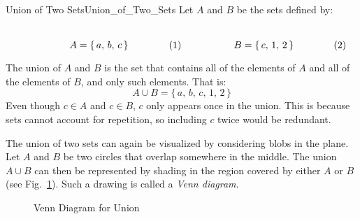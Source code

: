         \begin{fexample}{Union of Two Sets}{Union_of_Two_Sets}
            Let $A$ and $B$ be the sets defined by:
            \par
            \begin{subequations}
                \begin{minipage}[b]{0.49\textwidth}
                    \centering
                    \begin{equation}
                        A=\{\,a,\,b,\,c\,\}
                    \end{equation}
                \end{minipage}
                \hfill
                \begin{minipage}[b]{0.49\textwidth}
                    \centering
                    \begin{equation}
                        B=\{\,c,\,1,\,2\,\}
                    \end{equation}
                \end{minipage}
            \end{subequations}
            \par\vspace{2.5ex}
            The union of $A$ and $B$ is the set that contains all of the
            elements of $A$ and all of the elements of $B$, and only such
            elements. That is:
            \begin{equation}
                A\cup{B}=\{\,a,\,b,\,c,\,1,\,2\,\}
            \end{equation}
            Even though $c\in{A}$ and $c\in{B}$, $c$ only appears once in the
            union. This is because sets cannot account for repetition, so
            including $c$ twice would be redundant.
        \end{fexample}
        The union of two sets can again be visualized by considering blobs
        in the plane. Let $A$ and $B$ be two circles that overlap somewhere in
        the middle. The union $A\cup{B}$ can then be represented by shading in
        the region covered by either $A$ or $B$
        (see Fig.~\ref{fig:Union_of_Two_Sets}). Such a drawing is called a
        \textit{Venn diagram}.
        \begin{figure}[H]
            \centering
            \captionsetup{type=figure}
            
            \caption{Venn Diagram for Union}
            \label{fig:Union_of_Two_Sets}
        \end{figure}
